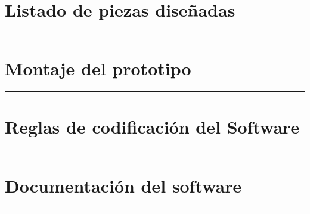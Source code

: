 \appendix
{}


     \chapter{Listado de piezas diseñadas} \label{app:listadoPiezas}
         \hrule
         \vspace{3mm}
     	 
    	
     \chapter{Montaje del prototipo} \label{app:montajePiezas}
         \hrule
         \vspace{3mm}
    	
     \chapter{Reglas de codificación del Software} \label{app:codificacionSW}
        \hrule
        \vspace{3mm}
     	
    
     \chapter{Documentación del software} \label{app:documentacion_software}
         \hrule
         \vspace{3mm}
     	 
        
